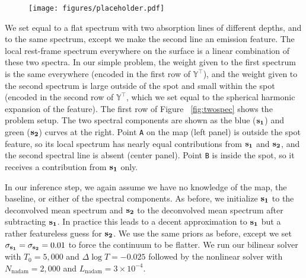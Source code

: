 \documentclass[modern]{aastex62}
\begin{document}
\begin{figure}[t!]
    \begin{centering}
        \texttt{[image: figures/placeholder.pdf]} %
    \end{centering}
\end{figure}
%
We set  equal to a flat spectrum with two absorption lines of
different depths, and  to the same spectrum, except we make the
second line an emission feature. The local rest-frame spectrum everywhere on the
surface is a linear combination of these two spectra. In our simple problem,
the weight given to the first spectrum is the same everywhere (encoded in
the first row of $\mathbb{Y}^\top$), and the weight
given to the second spectrum is large outside of the spot and small within
the spot (encoded in the second row of $\mathbb{Y}^\top$, which we set equal
to the spherical harmonic expansion of the \spot feature).
The first row of Figure ~\ref{fig:twospec} shows the problem setup. The two
spectral components are shown as the blue (${\mathbf{s_1}}$) and green
(${\mathbf{s_2}}$) curves at the right. Point \texttt{A} on the map (left panel)
is outside the spot feature, so its local spectrum has nearly equal
contributions from ${\mathbf{s_1}}$ and ${\mathbf{s_2}}$, and the second spectral
line is absent (center panel). Point \texttt{B} is inside the spot, so
it receives a contribution from ${\mathbf{s_1}}$ only.

In our inference step, we again assume we have no knowledge of the map,
the baseline, or either of the spectral components. As before, we initialize
${\mathbf{s_1}}$ to the deconvolved mean spectrum and ${\mathbf{s_2}}$ to the
deconvolved mean spectrum after subtracting ${\mathbf{s_1}}$. In practice this
leads to a decent approximation to ${\mathbf{s_1}}$ but a rather featureless
guess for ${\mathbf{s_2}}$. We use the same priors as before, except we
set $\sigma_{\mathbf{s_1}} = \sigma_{\mathbf{s_2}} = 0.01$ to force the continuum
to be flatter. We run our bilinear solver with $T_0 = 5,000$ and
$\Delta\log T = -0.025$ followed by the nonlinear solver with
$N_\mathrm{nadam} = 2,000$ and $L_\mathrm{nadam} = 3\times 10^{-4}$.
\end{document}
